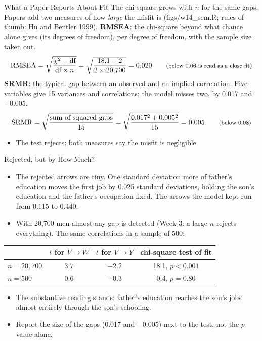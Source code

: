 \documentclass[aspectratio=169,11pt,xcolor=dvipsnames]{beamer}
\newcommand{\srcp}[1]{{\scriptsize\color{gray}(#1)}}
\begin{document}
\begin{frame}{What a Paper Reports About Fit}
The chi-square grows with $n$ for the same gaps. Papers add two measures of how \emph{large} the
misfit is \srcp{figs/w14\_sem.R; rules of thumb: Hu and Bentler 1999}.
\vskip4pt
\textbf{RMSEA}: the chi-square beyond what chance alone gives (its degrees of freedom), per
degree of freedom, with the sample size taken out.
\vskip-4pt
\[ \text{RMSEA} = \sqrt{\frac{\chi^2 - \text{df}}{\text{df} \times n}}
   = \sqrt{\frac{18.1 - 2}{2 \times 20{,}700}} = 0.020
   \qquad \text{\footnotesize (below 0.06 is read as a close fit)} \]
\vskip-4pt
\textbf{SRMR}: the typical gap between an observed and an implied correlation. Five variables
give 15 variances and correlations; the model misses two, by 0.017 and $-0.005$.
\vskip-4pt
\[ \text{SRMR} = \sqrt{\frac{\text{sum of squared gaps}}{15}}
   = \sqrt{\frac{0.017^2 + 0.005^2}{15}} = 0.005
   \qquad \text{\footnotesize (below 0.08)} \]
\vskip-4pt
\begin{itemize}\itemsep2pt
  \item The test rejects; both measures say the misfit is negligible.
\end{itemize}
\end{frame}

\begin{frame}{Rejected, but by How Much?}
\begin{itemize}\itemsep6pt
  \item The rejected arrows are tiny. One standard deviation more of father's education moves the
        first job by 0.025 standard deviations, holding the son's education and the father's
        occupation fixed. The arrows the model kept run from 0.115 to 0.440.
  \item With 20,700 men almost any gap is detected (Week 3: a large $n$ rejects everything). The
        same correlations in a sample of 500:
\end{itemize}
\begin{center}\small
\renewcommand{\arraystretch}{1.12}
\begin{tabular}{@{}lccc@{}}
\toprule
 & $t$ for $V \to W$ & $t$ for $V \to Y$ & chi-square test of fit \\
\midrule
$n = 20{,}700$ & 3.7 & $-2.2$ & 18.1, $p < 0.001$ \\
$n = 500$ & 0.6 & $-0.3$ & 0.4, $p = 0.80$ \\
\bottomrule
\end{tabular}
\end{center}
\begin{itemize}\itemsep6pt
  \item The substantive reading stands: father's education reaches the son's jobs almost entirely
        through the son's schooling.
  \item Report the size of the gaps (0.017 and $-0.005$) next to the test, not the $p$-value alone.
\end{itemize}
\end{frame}
\end{document}
